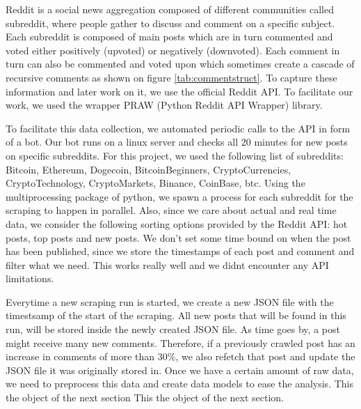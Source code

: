 Reddit is a social news aggregation composed of different communities called subreddit, where people gather to discuss and comment on a specific subject. Each subreddit is composed of main posts which are in turn commented and voted either positively (upvoted) or negatively (downvoted). Each comment in turn can also be commented and voted upon which sometimes create a cascade of recursive comments as shown on figure \ref{tab:commentstruct}. To capture these information and later work on it, we use the official Reddit API. To facilitate our work, we used the wrapper PRAW (Python Reddit API Wrapper) library.

To facilitate this data collection, we automated periodic calls to the API in form of a bot. Our bot runs on a linux server and checks all 20 minutes for new posts on specific subreddits. For this project, we used the following list of subreddits: Bitcoin, Ethereum, Dogecoin, BitcoinBeginners, CryptoCurrencies, CryptoTechnology, CryptoMarkets, Binance, CoinBase, btc.
Using the multiprocessing package of python, we spawn a process for each subreddit for the scraping to happen in parallel.
Also, since we care about actual and real time data, we consider the following sorting options provided by the Reddit API: hot posts, top posts and new posts. We don't set some time bound on when the post has been published, since we store the timestamps of each post and comment and filter what we need. This works really well and we didnt encounter any API limitations.

Everytime a new scraping run is started, we create a new JSON file with the timestsamp of the start of the scraping. All new posts that will be found in this run, will be stored inside the newly created JSON file. As time goes by, a post might receive many new comments. Therefore, if a previously crawled post has an increase in comments of more than 30\%, we also refetch that post and update the JSON file it was originally stored in. Once we have a certain amount of raw data, we need to preprocess this data and create data models to ease the analysis. This the object of the next section This the object of the next section.
